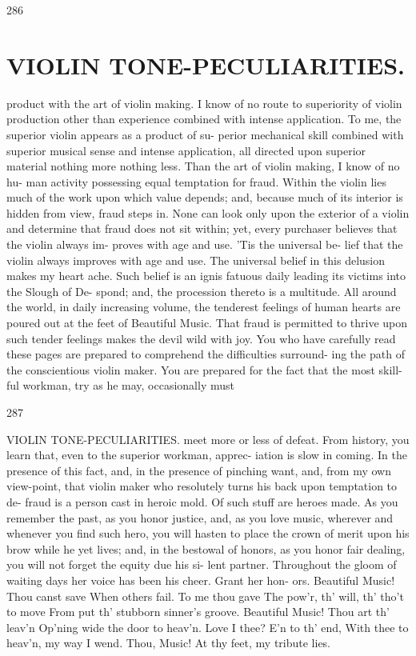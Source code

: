 \documentclass{article}
\begin{document}
286

\section*{VIOLIN TONE-PECULIARITIES.}
product with the art of violin making. I know of no route to superiority of violin production other than experience combined with intense application. To me, the superior violin appears as a product of su- perior mechanical skill combined with superior musical sense and intense application, all directed upon superior material nothing more nothing less. Than the art of violin making, I know of no hu- man activity possessing equal temptation for fraud. Within the violin lies much of the work upon which value depends; and, because much of its interior is hidden from view, fraud steps in. None can look only upon the exterior of a violin and determine that fraud does not sit within; yet, every purchaser believes that the violin always im- proves with age and use. 'Tis the universal be- lief that the violin always improves with age and use. The universal belief in this delusion makes my heart ache. Such belief is an ignis fatuous daily leading its victims into the Slough of De- spond; and, the procession thereto is a multitude. All around the world, in daily increasing volume, the tenderest feelings of human hearts are poured out at the feet of Beautiful Music. That fraud is permitted to thrive upon such tender feelings makes the devil wild with joy. You who have carefully read these pages are prepared to comprehend the difficulties surround- ing the path of the conscientious violin maker. You are prepared for the fact that the most skill- ful workman, try as he may, occasionally must

287

VIOLIN TONE-PECULIARITIES. meet more or less of defeat. From history, you learn that, even to the superior workman, apprec- iation is slow in coming. In the presence of this fact, and, in the presence of pinching want, and, from my own view-point, that violin maker who resolutely turns his back upon temptation to de- fraud is a person cast in heroic mold. Of such stuff are heroes made. As you remember the past, as you honor justice, and, as you love music, wherever and whenever you find such hero, you will hasten to place the crown of merit upon his brow while he yet lives; and, in the bestowal of honors, as you honor fair dealing, you will not forget the equity due his si- lent partner. Throughout the gloom of waiting days her voice has been his cheer. Grant her hon- ors. Beautiful Music! Thou canst save When others fail. To me thou gave The pow'r, th' will, th' tho't to move From put th' stubborn sinner's groove. Beautiful Music! Thou art th' leav'n Op'ning wide the door to heav'n. Love I thee? E'n to th' end, With thee to heav'n, my way I wend. Thou, Music! At thy feet, my tribute lies.
\end{document}
